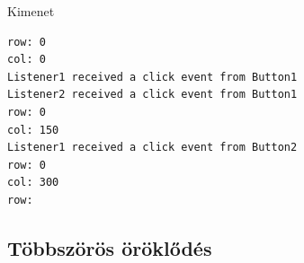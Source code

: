 \begin{frame}
    \begin{exampleblock}{}
        \scriptsize
        \vspace{-.2cm}
        
        \vspace{-.2cm}
    \end{exampleblock}
\end{frame}

\begin{frame}
    \begin{exampleblock}{}
        \footnotesize
        \vspace{-.2cm}
        
        \vspace{-.2cm}
    \end{exampleblock}
\end{frame}

\begin{frame}
    \begin{exampleblock}{}
        \scriptsize
        \vspace{-.2cm}
        
        \vspace{-.2cm}
    \end{exampleblock}
\end{frame}

\begin{frame}[fragile]
    \begin{block}{Kimenet}
        \vspace{-.3cm}
        \begin{verbatim}
row: 0
col: 0
Listener1 received a click event from Button1
Listener2 received a click event from Button1
row: 0
col: 150
Listener1 received a click event from Button2
row: 0
col: 300
row:     
        \end{verbatim}
        \vspace{-.6cm}
    \end{block}
\end{frame}

\subsection{Többszörös öröklődés}

